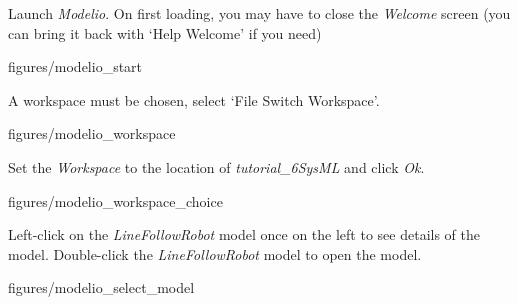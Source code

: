 \documentclass[11pt,a4paper]{../tutorial}
\begin{document}
\begin{instructions}

\item Launch \emph{Modelio}. On first loading, you may have to close the \emph{Welcome} screen (you can bring it back with `Help \menusep Welcome' if you need)

\begin{center}
\begin{annotation}[width=1\linewidth,trim=0 400 0 0,clip]{figures/modelio_start}
    \end{annotation}
\end{center}

\item A workspace must be chosen, select `File \menusep Switch Workspace’.

\begin{center}
\begin{annotation}[width=1\linewidth,trim=0 700 0 0,clip]{figures/modelio_workspace}
    \end{annotation}
\end{center}


\newpage

\item Set the \emph{Workspace} to the location of \emph{tutorial\_6\pathsep{}SysML} and click \emph{Ok}.

\begin{center}
\begin{annotation}[width=0.5\linewidth,trim=0 0 0 0,clip]{figures/modelio_workspace_choice}
    \end{annotation}
\end{center}


\item Left-click on the \emph{LineFollowRobot} model once on the left to see details of the model. Double-click the \emph{LineFollowRobot} model to open the model.

\begin{center}
\begin{annotation}[width=1\linewidth,trim=0 300 0 0,clip]{figures/modelio_select_model}
    \end{annotation}
\end{center}

\end{instructions}
\end{document}

